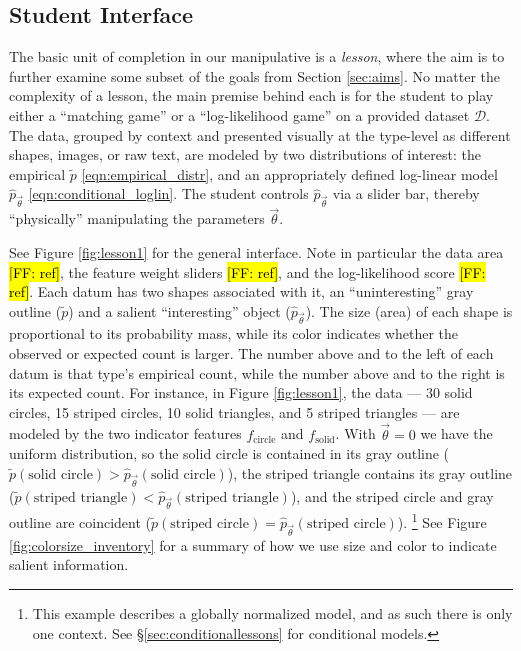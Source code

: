 \documentclass[11pt,letterpaper]{article}
\newcommand{\Note}[1]{}
\renewcommand{\Note}[1]{\hl{[#1]}}
\newcommand{\NoteSigned}[3]{{\sethlcolor{#2}\Note{#1: #3}}}
\newcommand{\NoteFF}[1]{\NoteSigned{FF}{LightBlue}{#1}}
\newcommand{\empirical}[0]{\ensuremath{\tilde{p}}}
\newcommand{\Data}[0]{\ensuremath{\mathcal{D}}}
\begin{document}
\subsection{Student Interface}
The basic unit of completion in our manipulative is a \textit{lesson}, where 
the aim is to further examine some subset of the goals from Section \ref{sec:aims}.
No matter the complexity of a lesson, the main premise behind each is for the 
student to play either a ``matching game'' or a ``log-likelihood game'' on a provided 
dataset \Data{}. The data, grouped by context and presented visually at the type-level as different shapes, 
images, or raw text, are modeled by two distributions of interest: the empirical 
$\tilde{p}$ \eqref{eqn:empirical_distr}, and an appropriately
defined log-linear model $\hat{p}_{\vec{\theta}}$ \eqref{eqn:conditional_loglin}.
The student controls $\hat{p}_{\vec{\theta}}$ via a slider bar, thereby ``physically'' 
manipulating the parameters $\vec{\theta}$. 

See Figure \ref{fig:lesson1} for the
general interface. Note in particular the data area 
\NoteFF{ref}, the feature weight sliders \NoteFF{ref}, and the log-likelihood 
score \NoteFF{ref}. Each datum has two shapes associated with it, 
an ``uninteresting'' gray outline ($\empirical{}$) and a salient ``interesting'' 
object ($\hat{p}_{\vec{\theta}}$). The size (area) of each
shape is proportional to its probability mass, while its color indicates whether the observed 
or expected count is larger.
The number above and to the left of each datum is that type's empirical 
count, while the number above and to the right is its expected count. 
For instance, in Figure \ref{fig:lesson1}, the data --- 30 solid circles, 15 striped circles, 10 solid triangles, 
and 5 striped triangles --- are modeled by the two indicator features $f_{\textrm{circle}}$ and
$f_{\textrm{solid}}$. With $\vec{\theta} = 0$ we have the uniform distribution, so the solid circle 
is contained in its gray outline ($\empirical{}(\textrm{solid circle}) > 
\hat{p}_{\vec{\theta}}(\textrm{solid circle})$), the striped triangle contains its gray outline 
($\empirical{}(\textrm{striped triangle}) < \hat{p}_{\vec{\theta}}(\textrm{striped triangle})$), and
the striped circle and gray outline are coincident
($\empirical{}(\textrm{striped circle}) = \hat{p}_{\vec{\theta}}(\textrm{striped circle})$).
\footnote{This example describes a globally normalized model, and as such 
there is only one context. See \S\ref{sec:conditionallessons} for conditional models.}
See Figure \ref{fig:colorsize_inventory} for a summary of how we use size and color to
indicate salient information.
\end{document}
